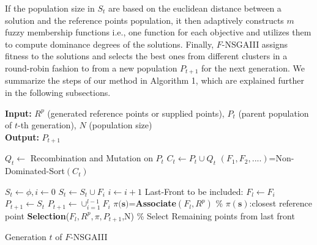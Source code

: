 \documentclass[letterpaper, 10 pt, conference]{ieeeconf}  %
\begin{document}
If the population size in $S_t$ are based on the euclidean distance between a solution and the reference points population, it then adaptively constructs $m$ fuzzy membership functions i.e., one function for each objective 
and utilizes them to compute dominance degrees of the solutions. Finally, $F$-NSGAIII assigns fitness to the solutions and selects the best ones from different clusters in a round-robin fashion to from a new population $P_{t+1}$ for the next generation.  
We summarize the steps of our method in Algorithm 1, which are explained further in the following subsections.



 \begin{algorithm}[!h]
	
 	\textbf{Input:} $R^p$ (generated reference points or supplied points), $P_t$ (parent population of $t$-th generation), $N$ (population size)\\
 	\textbf{Output:} $P_{t+1}$
	
 	\begin{algorithmic}[1]
		\State $Q_t \gets $ Recombination and Mutation on $P_t$
 		\State $C_t \gets P_t \cup Q_t$				 	
 		\State $(F_1,F_2,....)$=Non-Dominated-Sort$(C_t)$
        
        \State $S_t \gets \phi , i\gets 0$
        \State $S_t \gets S_t \cup F_i$
        \State $i \gets i+1$
        \EndWhile
        \State Last-Front to be included: $F_l \gets F_i$
        \State $P_{t+1} \gets S_t$
        \Else
        \State $P_{t+1} \gets \cup _{i=1}^{l-1}F_i$
        \State $\pi({\textbf{s})}$=\textbf{Associate}$(F_l,R^p)$ \% $\pi({\textbf{s}})$:closest reference point 
        \State \textbf{Selection}($F_l,R^p,\pi,P_{t+1}$,N)  \% Select Remaining points from last front
        
        \EndIf
        
        
		
	\end{algorithmic} 
	
	\caption{Generation $t$ of $F$-NSGAIII}
	
 	\label{alg:completeAlgorithm}
 \end{algorithm}
\end{document}
